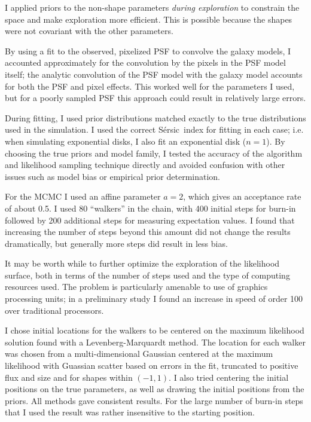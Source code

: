 \documentclass[usegraphicx,usenatbib]{mn2e}
\newcommand{\sersic}{S\'{e}rsic}
\begin{document}
I applied priors to the non-shape parameters {\it during exploration} to
constrain the space and make exploration more efficient.  This is possible
because the shapes were not covariant with the other parameters.

By using a fit to the observed, pixelized PSF to convolve the galaxy models, I
accounted approximately for the convolution by the pixels in the PSF model
itself;  the analytic convolution of the PSF model with the galaxy model
accounts for both the PSF and pixel effects.  This worked well for the
parameters I used, but for a poorly sampled PSF this approach could result in
relatively large errors.

During fitting, I used prior distributions matched exactly to the true
distributions used in the simulation.  I used the correct \sersic\ index for
fitting in each case; i.e. when simulating exponential disks, I also fit an
exponential disk ($n=1$).  By choosing the true priors and model family, I
tested the accuracy of the algorithm and likelihood sampling technique directly
and avoided confusion with other issues such as model bias or empirical prior
determination.

For the MCMC I used an affine parameter $a=2$, which gives an acceptance rate
of about 0.5. I used 80 ``walkers'' in the chain, with 400 initial steps for
burn-in followed by 200 additional steps for measuring expectation values.  I
found that increasing the number of steps beyond this amount did not change
the results dramatically, but generally more steps did result in less bias.

It may be worth while to further optimize the exploration of the likelihood
surface, both in terms of the number of steps used and the type of computing
resources used.  The problem is particularly amenable to use of graphics
processing units; in a preliminary study I found an increase in speed of order
100 over traditional processors.

I chose initial locations for the walkers to be centered on the maximum
likelihood solution found with a Levenberg-Marquardt method. The location for
each walker was chosen from a multi-dimensional Gaussian centered at the
maximum likelihood with Guassian scatter based on errors in the fit, truncated
to positive flux and size and for shapes within $(-1,1)$.  I also tried
centering the initial positions on the true parameters, as well as drawing the
initial positions from the priors.  All methods gave consistent results.  For
the large number of burn-in steps that I used the result was rather insensitive
to the starting position.
\end{document}
